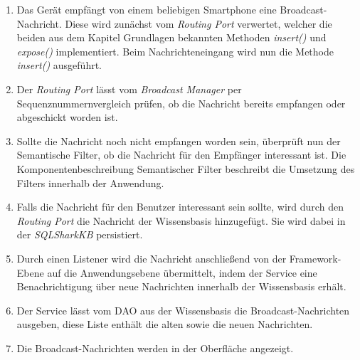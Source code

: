 \begin{enumerate}
	\item Das Gerät empfängt von einem beliebigen Smartphone eine Broadcast-Nachricht. Diese wird zunächst vom \textit{Routing Port} verwertet, welcher die beiden aus dem Kapitel Grundlagen bekannten Methoden \textit{insert()} und \textit{expose()} implementiert. Beim Nachrichteneingang wird nun die Methode \textit{insert()} ausgeführt.
	\item Der \textit{Routing Port} lässt vom \textit{Broadcast Manager} per Sequenznummernvergleich prüfen, ob die Nachricht bereits empfangen oder abgeschickt worden ist.
	\item Sollte die Nachricht noch nicht empfangen worden sein, überprüft nun der Semantische Filter, ob die Nachricht für den Empfänger interessant ist. Die Komponentenbeschreibung Semantischer Filter beschreibt die Umsetzung des Filters innerhalb der Anwendung. 
	\item Falls die Nachricht für den Benutzer interessant sein sollte, wird durch den \textit{Routing Port} die Nachricht der Wissensbasis hinzugefügt. Sie wird dabei in der \textit{SQLSharkKB} persistiert.
	\item Durch einen Listener wird die Nachricht anschließend von der Framework-Ebene auf die Anwendungsebene übermittelt, indem der Service eine Benachrichtigung über neue Nachrichten innerhalb der Wissensbasis erhält. 
	\item Der Service lässt vom DAO aus der Wissensbasis die Broadcast-Nachrichten ausgeben, diese Liste enthält die alten sowie die neuen Nachrichten.
	\item Die Broadcast-Nachrichten werden in der Oberfläche angezeigt.
\end{enumerate}

